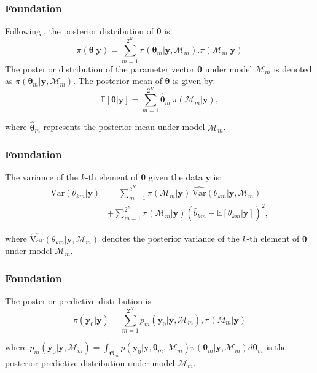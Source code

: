\documentclass[12pt, compress]{beamer}
\begin{document}
\begin{frame}
	\frametitle{Foundation}
Following \cite{Raftery93}, the posterior distribution of $\bm{\theta}$ is 
\begin{equation*}
	\pi(\bm{\theta}|\bm{y})= \sum_{m=1}^{2^K}\pi(\bm{\theta}_m|\bm{y},\mathcal{M}_m). \pi(\mathcal{M}_m|\bm{y})
\end{equation*}
The posterior distribution of the parameter vector \(\bm{\theta}\) under model \(\mathcal{M}_m\) is denoted as \(\pi(\bm{\theta}_m|\bm{y}, \mathcal{M}_m)\). The posterior mean of \(\bm{\theta}\) is given by:
\[
\mathbb{E}[\bm{\theta}|\bm{y}] = \sum_{m=1}^{2^K} \hat{\bm{\theta}}_m \, \pi(\mathcal{M}_m|\bm{y}),
\]

where \(\hat{\bm{\theta}}_m\) represents the posterior mean under model \(\mathcal{M}_m\).

\end{frame}

\begin{frame}
	\frametitle{Foundation}
The variance of the \(k\)-th element of \(\bm{\theta}\) given the data \(\bm{y}\) is:
\begin{align*}
 \text{Var}(\theta_{km}|\bm{y}) &= \sum_{m=1}^{2^K} \pi(\mathcal{M}_m|\bm{y}) \, \widehat{\text{Var}}(\theta_{km}|\bm{y}, \mathcal{M}_m) \\
 &+ \sum_{m=1}^{2^K} \pi(\mathcal{M}_m|\bm{y}) \left( \hat{\theta}_{km} - \mathbb{E}[\theta_{km}|\bm{y}] \right)^2,   
\end{align*}

where \(\widehat{\text{Var}}(\theta_{km}|\bm{y}, \mathcal{M}_m)\) denotes the posterior variance of the \(k\)-th element of \(\bm{\theta}\) under model \(\mathcal{M}_m\).

\end{frame}

\begin{frame}
	\frametitle{Foundation}
The posterior predictive distribution is
\begin{equation*}
	\pi(\bm{y}_0|\bm{y})= \sum_{m=1}^{2^K}p_m(\bm{y}_0|\bm{y},\mathcal{M}_m), \pi(M_m|\bm{y})
\end{equation*}

where $p_m(\bm{y}_0|\bm{y},\mathcal{M}_m)=\int_{\bm{\Theta}_m} p(\bm{y}_0|\bm{y},\bm{\theta}_m,\mathcal{M}_m)\pi(\bm{\theta}_m |\bm{y}, \mathcal{M}_m) d\bm{\theta}_{m}$ is the posterior predictive distribution under model $\mathcal{M}_m$. 
\end{frame}
\end{document}

